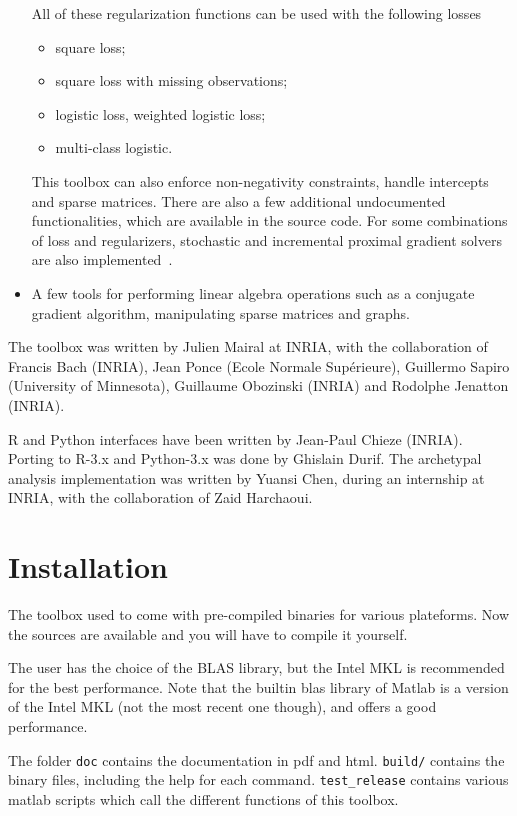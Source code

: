 \documentclass[a4paper, 11pt]{article}
\begin{document}
\begin{itemize}
\begin{itemize}
\end{itemize}
All of these regularization functions can be used with the following losses
\begin{itemize}
\item square loss;
\item square loss with missing observations;
\item logistic loss, weighted logistic loss;
\item multi-class logistic.
\end{itemize}
This toolbox can also enforce non-negativity constraints, handle intercepts and
sparse matrices.  There are also a few additional undocumented functionalities,
which are available in the source code.
For some combinations of loss and regularizers, stochastic and incremental proximal
gradient solvers are also implemented~\cite{mairal15,mairal16}.
\item A few tools for performing linear algebra operations such as a
conjugate gradient algorithm, manipulating sparse matrices and graphs.
\end{itemize}

The toolbox was written by Julien Mairal at INRIA, with the collaboration of
Francis Bach (INRIA), Jean Ponce (Ecole Normale Sup\'erieure), Guillermo Sapiro
(University of Minnesota), Guillaume Obozinski (INRIA) and Rodolphe Jenatton
(INRIA).

R and Python interfaces have been written by Jean-Paul Chieze (INRIA). Porting
to R-3.x and Python-3.x was done by Ghislain Durif.
The archetypal analysis implementation was written by Yuansi Chen, during
an internship at INRIA, with the collaboration of Zaid Harchaoui.

\section{Installation}
The toolbox used to come with pre-compiled binaries for various plateforms.
Now the sources are available and you will have to compile it yourself.

The user has the choice of the BLAS library, but the Intel MKL is recommended
for the best performance. Note that the builtin blas library of Matlab is a
version of the Intel MKL (not the most recent one though), and offers
a good performance.

The folder \verb|doc| contains the documentation in pdf and html. \verb|build/|
contains the binary files, including the help for each command.
\verb|test_release| contains various matlab scripts which call the different
functions of this toolbox.
\end{document}
